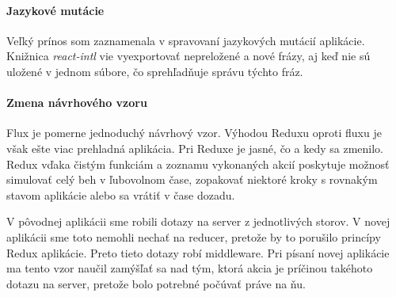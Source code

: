 \paragraph{Jazykové mutácie}
Veľký prínos som zaznamenala v spravovaní jazykových mutácií aplikácie. Knižnica \emph{react-intl} vie vyexportovať nepreložené a nové frázy, aj keď nie sú uložené v jednom súbore, čo sprehľadňuje správu týchto fráz.

\paragraph{Zmena návrhového vzoru}
Flux je pomerne jednoduchý návrhový vzor. Výhodou Reduxu oproti fluxu je však ešte viac prehladná aplikácia. Pri Reduxe je jasné, čo a kedy sa zmenilo. Redux vďaka čistým funkciám a zoznamu vykonaných akcií poskytuje možnosť simulovať celý beh v ľubovolnom čase, zopakovať niektoré kroky s rovnakým stavom aplikácie alebo sa vrátiť v čase dozadu.

V pôvodnej aplikácii sme robili dotazy na server z jednotlivých storov. V novej aplikácii sme toto nemohli nechať na reducer, pretože by to porušilo princípy Redux aplikácie. Preto tieto dotazy robí middleware. Pri písaní novej aplikácie ma tento vzor naučil zamýšľať sa nad tým, ktorá akcia je príčinou takéhoto dotazu na server, pretože bolo potrebné počúvať práve na ňu.

